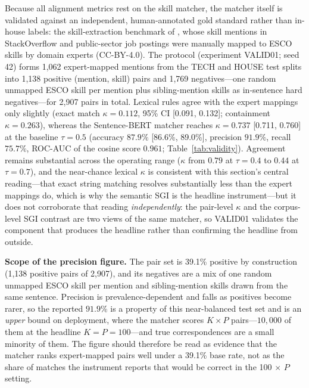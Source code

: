 \documentclass[journal]{IEEEtran}
\begin{document}
Because all alignment metrics rest on the skill matcher, the matcher itself
is validated against an independent, human-annotated gold standard rather
than in-house labels: the skill-extraction benchmark of
\cite{decorte2022negative}, whose skill mentions in StackOverflow and
public-sector job postings were manually mapped to ESCO skills
\cite{zhang2022skillspan, esco2026} by domain experts (CC-BY-4.0). The
protocol (experiment VALID01; seed 42) forms 1,062 expert-mapped mentions
from the TECH and HOUSE test splits into 1,138 positive (mention, skill)
pairs and 1,769 negatives---one random unmapped ESCO skill per mention plus
sibling-mention skills as in-sentence hard negatives---for 2,907 pairs in
total. Lexical rules agree with the expert mappings only slightly (exact
match $\kappa = 0.112$, 95\% CI [0.091, 0.132]; containment $\kappa =
0.263$), whereas the Sentence-BERT matcher reaches $\kappa = 0.737$ [0.711,
0.760] at the baseline $\tau = 0.5$ (accuracy $87.9\%$ [86.6\%, 89.0\%],
precision $91.9\%$, recall $75.7\%$, ROC-AUC of the cosine score $0.961$;
Table~\ref{tab:validity}). Agreement remains substantial across the
operating range ($\kappa$ from $0.79$ at $\tau = 0.4$ to $0.44$ at $\tau =
0.7$), and the near-chance lexical $\kappa$ is consistent with this section's
central reading---that exact string matching resolves substantially less than
the expert mappings do, which is why the semantic SGI is the headline
instrument---but it does not corroborate that reading \emph{independently}:
the pair-level $\kappa$ and the corpus-level SGI contrast are two views of the
same matcher, so VALID01 validates the component that produces the headline
rather than confirming the headline from outside.

\textbf{Scope of the precision figure.} The pair set is 39.1\% positive by
construction (1,138 positive pairs of 2,907), and its negatives are a mix of
one random unmapped ESCO skill per mention and sibling-mention skills drawn
from the same sentence. Precision is prevalence-dependent and falls as
positives become rarer, so the reported $91.9\%$ is a property of this
near-balanced test set and is an \emph{upper} bound on deployment, where the
matcher scores $K \times P$ pairs---$10{,}000$ of them at the headline $K = P
= 100$---and true correspondences are a small minority of them. The figure
should therefore be read as evidence that the matcher ranks expert-mapped
pairs well under a 39.1\% base rate, not as the share of matches the
instrument reports that would be correct in the 100 $\times$ $P$ setting.
\end{document}
